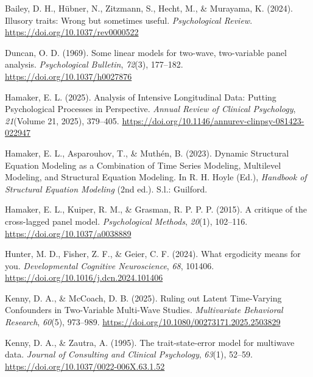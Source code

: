 \documentclass[
  man,
  floatsintext,
  longtable,
  nolmodern,
  notxfonts,
  notimes,
  colorlinks=true,linkcolor=blue,citecolor=blue,urlcolor=blue]{apa7}
\newlength{\cslhangindent}
\newenvironment{CSLReferences}[2] %
 {\begin{list}{}{%
  \setlength{\itemindent}{0pt}
  \setlength{\leftmargin}{0pt}
  \setlength{\parsep}{0pt}
  \ifodd #1
   \setlength{\leftmargin}{\cslhangindent}
   \setlength{\itemindent}{-1\cslhangindent}
  \fi
  \setlength{\itemsep}{#2\baselineskip}}}
 {\end{list}}
\begin{document}
\protect{}\label{refs}
\begin{CSLReferences}{1}{0}
Bailey, D. H., Hübner, N., Zitzmann, S., Hecht, M., \& Murayama, K.
(2024). Illusory traits: {Wrong} but sometimes useful.
\emph{Psychological Review}. \url{https://doi.org/10.1037/rev0000522}

Duncan, O. D. (1969). Some linear models for two-wave, two-variable
panel analysis. \emph{Psychological Bulletin}, \emph{72}(3), 177--182.
\url{https://doi.org/10.1037/h0027876}

Hamaker, E. L. (2025). Analysis of {Intensive Longitudinal Data}:
{Putting Psychological Processes} in {Perspective}. \emph{Annual Review
of Clinical Psychology}, \emph{21}(Volume 21, 2025), 379--405.
\url{https://doi.org/10.1146/annurev-clinpsy-081423-022947}

Hamaker, E. L., Asparouhov, T., \& Muthén, B. (2023). Dynamic
{Structural Equation Modeling} as a {Combination} of {Time Series
Modeling}, {Multilevel Modeling}, and {Structural Equation Modeling}. In
R. H. Hoyle (Ed.), \emph{Handbook of {Structural Equation Modeling}}
(2nd ed.). S.l.: Guilford.

Hamaker, E. L., Kuiper, R. M., \& Grasman, R. P. P. P. (2015). A
critique of the cross-lagged panel model. \emph{Psychological Methods},
\emph{20}(1), 102--116. \url{https://doi.org/10.1037/a0038889}

Hunter, M. D., Fisher, Z. F., \& Geier, C. F. (2024). What ergodicity
means for you. \emph{Developmental Cognitive Neuroscience}, \emph{68},
101406. \url{https://doi.org/10.1016/j.dcn.2024.101406}

Kenny, D. A., \& McCoach, D. B. (2025). Ruling out {Latent Time-Varying
Confounders} in {Two-Variable Multi-Wave Studies}. \emph{Multivariate
Behavioral Research}, \emph{60}(5), 973--989.
\url{https://doi.org/10.1080/00273171.2025.2503829}

Kenny, D. A., \& Zautra, A. (1995). The trait-state-error model for
multiwave data. \emph{Journal of Consulting and Clinical Psychology},
\emph{63}(1), 52--59. \url{https://doi.org/10.1037/0022-006X.63.1.52}


\end{CSLReferences}
\end{document}
